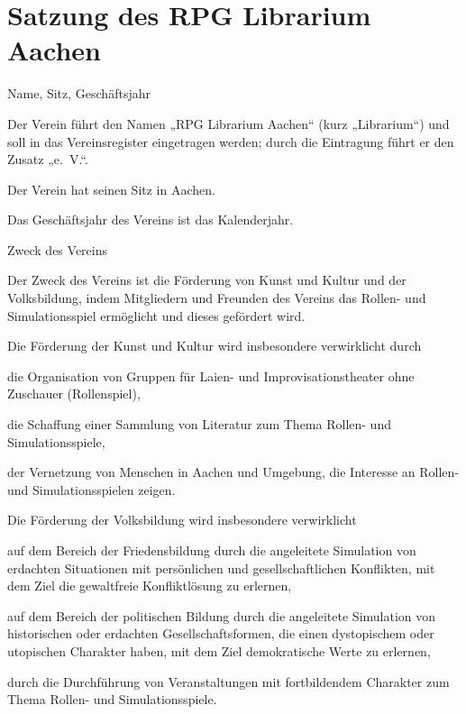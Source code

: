 



	\midsloppy
\chapter{Satzung des RPG Librarium Aachen}
\begin{para}{Name, Sitz, Geschäftsjahr}
	\item Der Verein führt den Namen „RPG Librarium Aachen“ (kurz „Librarium“) und soll in das Vereinsregister eingetragen werden; durch die Eintragung führt er den Zusatz „e.~V.“.
	\item Der Verein hat seinen Sitz in Aachen.
	\item Das Geschäftsjahr des Vereins ist das Kalenderjahr.
\end{para}

\begin{para}{Zweck des Vereins}
	\item Der Zweck des Vereins ist die Förderung von Kunst und Kultur und der Volksbildung, indem Mitgliedern und Freunden des Vereins das Rollen- und Simulationsspiel ermöglicht und dieses gefördert wird.
	\item Die Förderung der Kunst und Kultur wird insbesondere verwirklicht durch
	\begin{subpara}
		\item die Organisation von Gruppen für Laien- und Improvisationstheater ohne Zuschauer (Rollenspiel),
		\item die Schaffung einer Sammlung von Literatur zum Thema Rollen- und Simulationsspiele,
		\item der Vernetzung von Menschen in Aachen und Umgebung, die Interesse an Rollen- und Simulationsspielen zeigen.
	\end{subpara}
	\item Die Förderung der Volksbildung wird insbesondere verwirklicht 
	\begin{subpara}
		\item auf dem Bereich der Friedensbildung durch die angeleitete Simulation von erdachten Situationen mit persönlichen und gesellschaftlichen Konflikten, mit dem Ziel die gewaltfreie Konfliktlösung zu erlernen,
		\item auf dem Bereich der politischen Bildung durch die angeleitete Simulation von historischen oder erdachten Gesellschaftsformen, die einen dystopischem oder utopischen Charakter haben, mit dem Ziel demokratische Werte zu erlernen,
		\item durch die Durchführung von Veranstaltungen mit fortbildendem Charakter zum Thema Rollen- und Simulationsspiele.
	\end{subpara}
\end{para}

